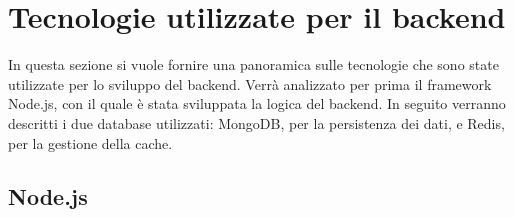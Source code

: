 
\section{Tecnologie utilizzate per il backend\label{sec:tecnologie-backend-background}}

In questa sezione si vuole fornire una panoramica sulle tecnologie che sono state utilizzate per lo sviluppo del backend. Verrà analizzato per prima il framework Node.js, con il quale è stata sviluppata la logica del backend. In seguito verranno descritti i due database utilizzati: MongoDB, per la persistenza dei dati, e Redis, per la gestione della cache.

\subsection{Node.js}

